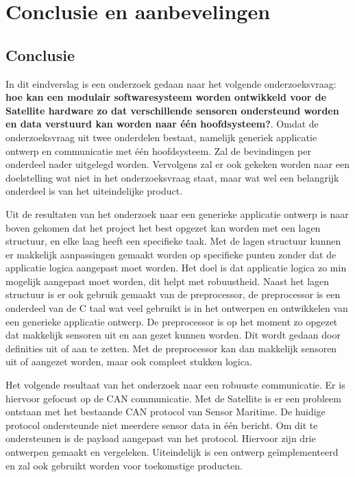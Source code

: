 \chapter{Conclusie en aanbevelingen}
\section{Conclusie}
In dit eindverslag is een onderzoek gedaan naar het volgende onderzoeksvraag: \textbf{hoe kan een modulair softwaresysteem worden ontwikkeld voor de Satellite hardware zo dat verschillende sensoren ondersteund worden en data verstuurd kan worden naar één hoofdsysteem?}. Omdat de onderzoeksvraag uit twee onderdelen bestaat, namelijk generiek applicatie ontwerp en communicatie met één hoofdsysteem. Zal de bevindingen per onderdeel nader uitgelegd worden. Vervolgens zal er ook gekeken worden naar een doelstelling wat niet in het onderzoeksvraag staat, maar wat wel een belangrijk onderdeel is van het uiteindelijke product. \newline

\noindent Uit de resultaten van het onderzoek naar een generieke applicatie ontwerp is naar boven gekomen dat het project het best opgezet kan worden met een lagen structuur, en elke laag heeft een specifieke taak. Met de lagen structuur kunnen er makkelijk aanpassingen gemaakt worden op specifieke punten zonder dat de applicatie logica aangepast moet worden. Het doel is dat applicatie logica zo min mogelijk aangepast moet worden, dit helpt met robuustheid. Naast het lagen structuur is er ook gebruik gemaakt van de preprocessor, de preprocessor is een onderdeel van de C taal wat veel gebruikt is in het ontwerpen en ontwikkelen van een generieke applicatie ontwerp. De preprocessor is op het moment zo opgezet dat makkelijk sensoren uit en aan gezet kunnen worden. Dit wordt gedaan door definities uit of aan te zetten. Met de preprocessor kan dan makkelijk sensoren uit of aangezet worden, maar ook compleet stukken logica. \newline

\noindent Het volgende resultaat van het onderzoek naar een robuuste communicatie. Er is hiervoor gefocust op de CAN communicatie. Met de Satellite is er een probleem ontstaan met het bestaande CAN protocol van Sensor Maritime. De huidige protocol ondersteunde niet meerdere sensor data in één bericht. Om dit te ondersteunen is de payload aangepast van het protocol. Hiervoor zijn drie ontwerpen gemaakt en vergeleken. Uiteindelijk is een ontwerp geïmplementeerd en zal ook gebruikt worden voor toekomstige producten. \newline

